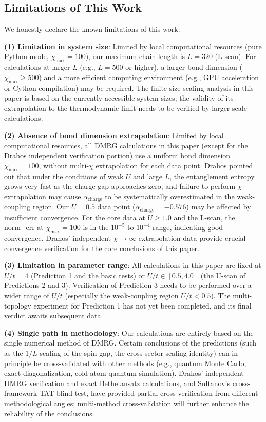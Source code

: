 \documentclass[prb,reprint,twocolumn,superscriptaddress]{revtex4-2}
\begin{document}
\subsection{Limitations of This Work}

We honestly declare the known limitations of this work:

\textbf{(1) Limitation in system size}: Limited by local computational resources (pure Python mode, $\chi_{\max} = 100$), our maximum chain length is $L = 320$ (L-scan). For calculations at larger $L$ (e.g., $L = 500$ or higher), a larger bond dimension ($\chi_{\max} \geq 500$) and a more efficient computing environment (e.g., GPU acceleration or Cython compilation) may be required. The finite-size scaling analysis in this paper is based on the currently accessible system sizes; the validity of its extrapolation to the thermodynamic limit needs to be verified by larger-scale calculations.

\textbf{(2) Absence of bond dimension extrapolation}: Limited by local computational resources, all DMRG calculations in this paper (except for the Drahos independent verification portion) use a uniform bond dimension $\chi_{\max} = 100$, without multi-$\chi$ extrapolation for each data point. Drahos pointed out that under the conditions of weak $U$ and large $L$, the entanglement entropy grows very fast as the charge gap approaches zero, and failure to perform $\chi$ extrapolation may cause $\alpha_{\mathrm{charge}}$ to be systematically overestimated in the weak-coupling region. Our $U = 0.5$ data point ($\alpha_{\mathrm{charge}} = -0.576$) may be affected by insufficient convergence. For the core data at $U \geq 1.0$ and the L-scan, the norm\_err at $\chi_{\max} = 100$ is in the $10^{-5}$ to $10^{-4}$ range, indicating good convergence. Drahos' independent $\chi \to \infty$ extrapolation data provide crucial convergence verification for the core conclusions of this paper.

\textbf{(3) Limitation in parameter range}: All calculations in this paper are fixed at $U/t = 4$ (Prediction 1 and the basic tests) or $U/t \in [0.5, 4.0]$ (the U-scan of Predictions 2 and 3). Verification of Prediction 3 needs to be performed over a wider range of $U/t$ (especially the weak-coupling region $U/t < 0.5$). The multi-topology experiment for Prediction 1 has not yet been completed, and its final verdict awaits subsequent data.

\textbf{(4) Single path in methodology}: Our calculations are entirely based on the single numerical method of DMRG. Certain conclusions of the predictions (such as the $1/L$ scaling of the spin gap, the cross-sector scaling identity) can in principle be cross-validated with other methods (e.g., quantum Monte Carlo, exact diagonalization, cold-atom quantum simulation). Drahos' independent DMRG verification and exact Bethe ansatz calculations, and Sultanov's cross-framework TAT blind test, have provided partial cross-verification from different methodological angles; multi-method cross-validation will further enhance the reliability of the conclusions.
\end{document}
